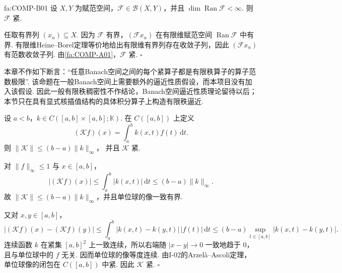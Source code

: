 \begin{FATheorem}[B][有限秩算子紧性]{fa:COMP-B01}
设 \(\displaystyle X,Y\) 为赋范空间，\(\displaystyle \mathcal F\in\mathcal B(X,Y)\)，并且 \(\displaystyle \dim\operatorname{Ran}\mathcal F<\infty\). 则 \(\displaystyle \mathcal F\) 紧.
\end{FATheorem}

\begin{FAProof}
任取有界列 \(\displaystyle (x_n)\subseteq X\). 因为 \(\displaystyle \mathcal F\) 有界，\(\displaystyle (\mathcal Fx_n)\) 在有限维赋范空间 \(\displaystyle \operatorname{Ran}\mathcal F\) 中有界. 有限维Heine--Borel定理等价地给出有限维有界列存在收敛子列，因此 \(\displaystyle (\mathcal Fx_n)\) 有范数收敛子列. 由\autoref{fa:COMP-A01}，\(\displaystyle \mathcal F\) 紧.
\hfill\(\square\)
\end{FAProof}

\begin{FAWarning}[一般有限秩稠密性不在本章成立]
本章不作如下断言：“任意Banach空间之间的每个紧算子都是有限秩算子的算子范数极限”. 该命题在一般Banach空间上需要额外的逼近性质假设，而本项目没有加入该假设. 因此一般有限秩稠密性不作结论，Banach空间逼近性质理论留待以后；本节只在具有显式核插值结构的具体积分算子上构造有限秩逼近.
\end{FAWarning}

\begin{FAExample}[连续核积分算子的紧性]\label{i13:ex-compact-integral}
设 \(\displaystyle a<b\)，\(\displaystyle k\in C([a,b]\times[a,b];\mathbb K)\). 在 \(\displaystyle C([a,b])\) 上定义
\[
(\mathcal Kf)(x)
=
\int_a^b k(x,t)f(t)\,\mathrm{d}t.
\]
则
\(\displaystyle \|\mathcal K\| \leqslant (b-a)\|k\|_\infty\)，
并且 \(\displaystyle \mathcal K\) 紧.
\end{FAExample}

\begin{FAProof}
对 \(\displaystyle \|f\|_\infty\leqslant1\) 与 \(\displaystyle x\in[a,b]\)，
\[
|(\mathcal Kf)(x)|
\leqslant
\int_a^b|k(x,t)|\,\mathrm{d}t
\leqslant
(b-a)\|k\|_\infty.
\]
故 \(\displaystyle \|\mathcal K\|\leqslant(b-a)\|k\|_\infty\)，并且单位球的像一致有界.

又对 \(\displaystyle x,y\in[a,b]\)，
\[
|(\mathcal Kf)(x)-(\mathcal Kf)(y)| \leqslant \int_a^b|k(x,t)-k(y,t)|\,|f(t)|\,\mathrm{d}t \leqslant (b-a)\sup_{t\in[a,b]}|k(x,t)-k(y,t)|.
\]
连续函数 \(\displaystyle k\) 在紧集 \(\displaystyle [a,b]^2\) 上一致连续，所以右端随 \(\displaystyle |x-y|\to0\) 一致地趋于 \(\displaystyle0\)，且与单位球中的 \(\displaystyle f\) 无关. 因而单位球的像等度连续. 由I-02的Arzelà--Ascoli定理，单位球像的闭包在 \(\displaystyle C([a,b])\) 中紧. 因此 \(\displaystyle \mathcal K\) 紧.
\hfill\(\square\)
\end{FAProof}

